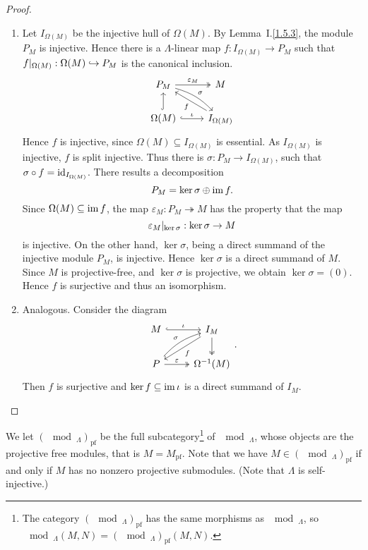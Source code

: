 \begin{proof}
\begin{enumerate}
\item Let $I_{\Omega(M)}$ be the injective hull of $\Omega(M)$. By Lemma~I.\ref{1.5.3}, the
  module $P_M$ is injective. Hence there is a $\Lambda$-linear map $f: I_{\Omega(M)} \to
  P_M$ such that ${f}|_{\Omega(M)} : \Omega(M) \hookrightarrow P_M$ is the canonical inclusion.
\[
\begin{tikzcd}
P_M \ar[r,"\varepsilon_M",two heads] \ar[rd,"\sigma",bend left=15] & M \\
\Omega(M) \ar[r,hook,"\iota"] \ar[u,hook] & I_{\Omega(M)} \ar[ul,"f"]
\end{tikzcd}
\]
  Hence $f$ is injective, since $\Omega(M) \subseteq I_{\Omega(M)}$ is essential. As $I_{\Omega(M)}$ is
  injective, $f$ is split injective. Thus there is $\sigma: P_M \to I_{\Omega(M)}$, such
  that $\sigma \circ f = \operatorname{id}_{I_{\Omega(M)}}$.
  There results a decomposition
  \[ P_M = \ker \sigma \oplus \operatorname{im} f.\]
  Since $\Omega(M) \subseteq \operatorname{im} f$, the map $\varepsilon_M : P_M \twoheadrightarrow M$ has the
  property that the map
  \[
   {\varepsilon_M}|_{\ker \sigma} : \ker \sigma \to M
  \] is injective. On the other
  hand, $\ker \sigma$, being a direct summand of the injective module $P_M$, is
  injective. Hence $\ker \sigma$ is a direct summand of $M$. Since $M$ is
  projective-free, and $\ker \sigma$ is projective, we obtain $\ker \sigma = (0)$. Hence
  $f$ is surjective and thus an isomorphism.
\item Analogous. Consider the diagram
\[
\begin{tikzcd}
M \ar[r,"\iota",hook] & I_M \ar[dl,"f"] \ar[d,two heads] \\
P \ar[r,two heads,"\varepsilon"] \ar[ur,"\sigma",bend left=15] & \Omega^{-1}(M)
\end{tikzcd}.
\]
Then $f$ is surjective and $\ker f \subseteq \operatorname{im}\iota$ is a direct summand of $I_M$.
\qedhere
\end{enumerate}
\end{proof}


We let $(\mod_\Lambda)_{\mathrm{pf}}$ be the full subcategory\footnote{The category $(\mod_\Lambda)_{\mathrm{pf}}$ has the same morphisms as $\mod_\Lambda$, so $\mod_\Lambda(M,N) = (\mod_\Lambda)_{\mathrm{pf}}(M,N)$.} of $\mod_\Lambda$, whose objects are the projective free modules, that is $M = M_{\mathrm{pf}}$.
Note that we have $M \in (\mod_\Lambda)_{\mathrm{pf}}$ if and only if $M$ has no nonzero projective
submodules. (Note that $\Lambda$ is self-injective.)

